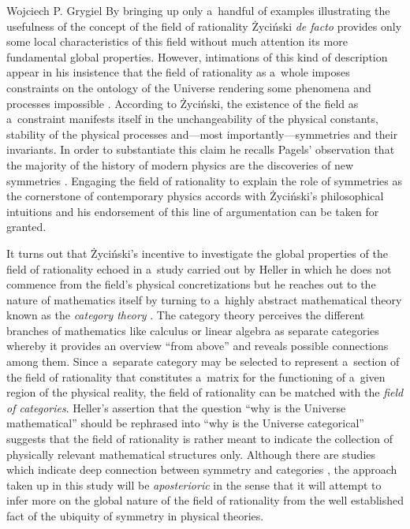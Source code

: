 \begin{artengenv}{Wojciech P. Grygiel}
By bringing up only a~handful of examples illustrating the usefulness of the concept of the field of rationality Życiński \textit{de facto} provides only some local characteristics of this field without much attention its more fundamental global properties. However, intimations of this kind of description appear in his insistence that the field of rationality as a~whole imposes constraints on the ontology of the Universe rendering some phenomena and processes impossible 
\parencite[][p.180]{zycinski_filozoficzne_1987}. %
 According to Życiński, the existence of the field as a~constraint manifests itself in the unchangeability of the physical constants, stability of the physical processes and---most importantly---symmetries and their invariants. In order to substantiate this claim he recalls Pagels' observation that the majority of the history of modern physics are the discoveries of new symmetries 
\parencite[][p.296]{pagels_cosmic_1983}. %
 Engaging the field of rationality to explain the role of symmetries as the cornerstone of contemporary physics accords with Życiński's philosophical intuitions and his endorsement of this line of argumentation can be taken for granted.



It turns out that Życiński's incentive to investigate the global properties of the field of rationality echoed in a~study carried out by Heller in which he does not commence from the field's physical concretizations but he reaches out to the nature of mathematics itself by turning to a~highly abstract mathematical theory known as the \textit{category theory} 
\parencite[][]{heller_field_2014}. %
 The category theory perceives the different branches of mathematics like calculus or linear algebra as separate categories whereby it provides an overview ``from above'' and reveals possible connections among them. Since a~separate category may be selected to represent a~section of the field of rationality that constitutes a~matrix for the functioning of a~given region of the physical reality, the field of rationality can be matched with the \textit{field of categories}. Heller's assertion that the question ``why is the Universe mathematical'' should be rephrased into ``why is the Universe categorical'' suggests that the field of rationality is rather meant to indicate the collection of physically relevant mathematical structures only. Although there are studies which indicate deep connection between symmetry and categories 
\parencite[e.g.,][]{heunen_principle_2008}, %
 the approach taken up in this study will be \textit{aposterioric} in the sense that it will attempt to infer more on the global nature of the field of rationality from the well established fact of the ubiquity of symmetry in physical theories.




\end{artengenv}
